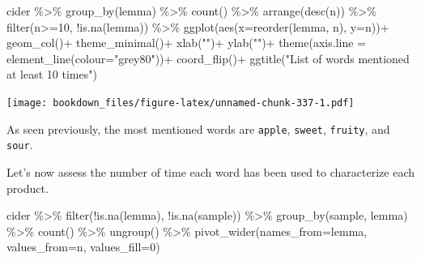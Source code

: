 \documentclass[
]{krantz}
\makeatletter
\newenvironment{Shaded}{\begin{snugshade}}{\end{snugshade}}
\newcommand{\AttributeTok}[1]{\textcolor[rgb]{0.61,0.61,0.61}{#1}}
\newcommand{\DecValTok}[1]{\textcolor[rgb]{0.06,0.06,0.06}{#1}}
\newcommand{\FunctionTok}[1]{\textcolor[rgb]{0,0,0}{#1}}
\newcommand{\NormalTok}[1]{#1}
\newcommand{\SpecialCharTok}[1]{\textcolor[rgb]{0,0,0}{#1}}
\newcommand{\StringTok}[1]{\textcolor[rgb]{0.5,0.5,0.5}{#1}}
\newenvironment{kframe}{%
\medskip{}
\setlength{\fboxsep}{.8em}
 \def\at@end@of@kframe{}%
 \ifinner\ifhmode%
  \def\at@end@of@kframe{\end{minipage}}%
  \begin{minipage}{\columnwidth}%
 \fi\fi%
 \def\FrameCommand##1{\hskip\@totalleftmargin \hskip-\fboxsep
 \colorbox{shadecolor}{##1}\hskip-\fboxsep
     \hskip-\linewidth \hskip-\@totalleftmargin \hskip\columnwidth}%
 \MakeFramed {\advance\hsize-\width
   \@totalleftmargin\z@ \linewidth\hsize
   \@setminipage}}%
 {\par\unskip\endMakeFramed%
 \at@end@of@kframe}
\renewenvironment{Shaded}{\begin{kframe}}{\end{kframe}}
\makeatother
\begin{document}
\begin{Shaded}
\begin{Highlighting}[]
\NormalTok{cider }\SpecialCharTok{\%\textgreater{}\%} 
  \FunctionTok{group\_by}\NormalTok{(lemma) }\SpecialCharTok{\%\textgreater{}\%} 
  \FunctionTok{count}\NormalTok{() }\SpecialCharTok{\%\textgreater{}\%} 
  \FunctionTok{arrange}\NormalTok{(}\FunctionTok{desc}\NormalTok{(n)) }\SpecialCharTok{\%\textgreater{}\%} 
  \FunctionTok{filter}\NormalTok{(n}\SpecialCharTok{\textgreater{}=}\DecValTok{10}\NormalTok{, }\SpecialCharTok{!}\FunctionTok{is.na}\NormalTok{(lemma)) }\SpecialCharTok{\%\textgreater{}\%} 
  \FunctionTok{ggplot}\NormalTok{(}\FunctionTok{aes}\NormalTok{(}\AttributeTok{x=}\FunctionTok{reorder}\NormalTok{(lemma, n), }\AttributeTok{y=}\NormalTok{n))}\SpecialCharTok{+}
  \FunctionTok{geom\_col}\NormalTok{()}\SpecialCharTok{+}
  \FunctionTok{theme\_minimal}\NormalTok{()}\SpecialCharTok{+}
  \FunctionTok{xlab}\NormalTok{(}\StringTok{""}\NormalTok{)}\SpecialCharTok{+}
  \FunctionTok{ylab}\NormalTok{(}\StringTok{""}\NormalTok{)}\SpecialCharTok{+}
  \FunctionTok{theme}\NormalTok{(}\AttributeTok{axis.line =} \FunctionTok{element\_line}\NormalTok{(}\AttributeTok{colour=}\StringTok{"grey80"}\NormalTok{))}\SpecialCharTok{+}
  \FunctionTok{coord\_flip}\NormalTok{()}\SpecialCharTok{+}
  \FunctionTok{ggtitle}\NormalTok{(}\StringTok{"List of words mentioned at least 10 times"}\NormalTok{)}
\end{Highlighting}
\end{Shaded}

\texttt{[image: bookdown\_files/figure-latex/unnamed-chunk-337-1.pdf]}

As seen previously, the most mentioned words are \texttt{apple}, \texttt{sweet}, \texttt{fruity}, and \texttt{sour}.

Let's now assess the number of time each word has been used to characterize each product.

\begin{Shaded}
\begin{Highlighting}[]
\NormalTok{cider }\SpecialCharTok{\%\textgreater{}\%} 
  \FunctionTok{filter}\NormalTok{(}\SpecialCharTok{!}\FunctionTok{is.na}\NormalTok{(lemma), }\SpecialCharTok{!}\FunctionTok{is.na}\NormalTok{(sample)) }\SpecialCharTok{\%\textgreater{}\%} 
  \FunctionTok{group\_by}\NormalTok{(sample, lemma) }\SpecialCharTok{\%\textgreater{}\%} 
  \FunctionTok{count}\NormalTok{() }\SpecialCharTok{\%\textgreater{}\%} 
  \FunctionTok{ungroup}\NormalTok{() }\SpecialCharTok{\%\textgreater{}\%} 
  \FunctionTok{pivot\_wider}\NormalTok{(}\AttributeTok{names\_from=}\NormalTok{lemma, }\AttributeTok{values\_from=}\NormalTok{n, }\AttributeTok{values\_fill=}\DecValTok{0}\NormalTok{)}
\end{Highlighting}
\end{Shaded}
\end{document}
